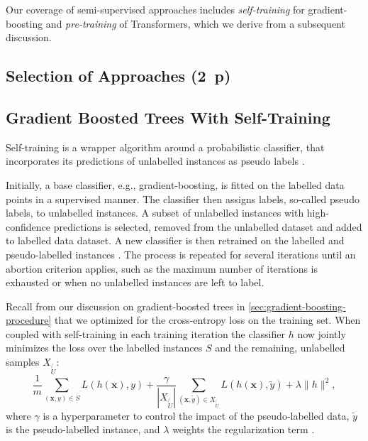 Our coverage of semi-supervised approaches includes \emph{self-training} for gradient-boosting and \emph{pre-training} of Transformers, which we derive from a subsequent discussion.

\subsection{Selection of Approaches (2~p)}\label{sec:selection-of-approaches-1}

\subsection{Gradient Boosted Trees With Self-Training}\label{sec:extensions-to-gradient-boosted-trees}

Self-training is a wrapper algorithm around a probabilistic classifier, that incorporates its predictions of unlabelled instances as pseudo labels \autocite[][190]{yarowskyUnsupervisedWordSense1995}.

Initially, a base classifier, e.g., gradient-boosting, is fitted on the labelled data points in a supervised manner. The classifier then assigns labels, so-called pseudo labels, to unlabelled instances. A subset of unlabelled instances with high-confidence predictions is selected, removed from the unlabelled dataset and added to labelled data dataset. A new classifier is then retrained on the labelled and pseudo-labelled instances \autocite[][190--192]{yarowskyUnsupervisedWordSense1995}. The process is repeated for several iterations until an abortion criterion applies, such as the maximum number of iterations is exhausted or when no unlabelled instances are left to label.


Recall from our discussion on gradient-boosted trees in \cref{sec:gradient-boosting-procedure} that we optimized for the cross-entropy loss on the training set. When coupled with self-training in each training iteration the classifier $h$ now jointly minimizes the loss over the labelled instances $S$ and the remaining, unlabelled samples $X_{\not{U}}$:
$$
    \frac{1}{m} \sum_{(\mathbf{x}, y) \in S} L(h(\mathbf{x}), y)+\frac{\gamma}{\left|X_{\not{U}}\right|} \sum_{(\mathbf{x}, \tilde{y}) \in X_{\not{U}}} L(h(\mathbf{x}), \tilde{y})+\lambda\|h\|^2,
$$
where $\gamma$ is a hyperparameter to control the impact of the pseudo-labelled data, $\tilde{y}$ is the pseudo-labelled instance, and $\lambda$ weights the regularization term \autocite[][4]{aminiSelfTrainingSurvey2023}.

